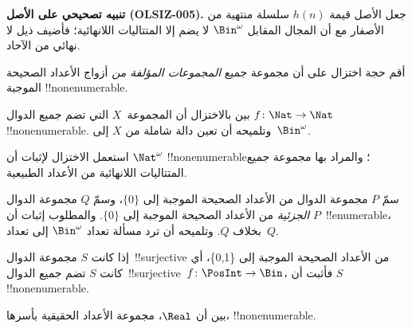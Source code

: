 \documentclass[../../../include/open-logic-section]{subfiles}
\begin{document}
\begin{editorial}
\textbf{تنبيه تصحيحي على الأصل (OLSIZ-005).}
جعل الأصل قيمة $h(n)$ سلسلة منتهية من الأصفار مع أن المجال المقابل
$\Bin^\omega$ لا يضم إلا المتتاليات اللانهائية؛ فأضيف ذيل لا نهائي من الآحاد.
\end{editorial}

\begin{prob}
أقم حجة اختزال على أن مجموعة جميع \emph{المجموعات المؤلفة من} أزواج الأعداد الصحيحة الموجبة !!{nonenumerable}.
\end{prob}

\begin{prob}\label{sfr:siz:red:prob:nat-nat}
بين بالاختزال أن المجموعة~$X$ التي تضم جميع الدوال $f\colon \Nat \to \Nat$ !!{nonenumerable}. وتلميحه أن تعين دالة شاملة من $X$ إلى~$\Bin^\omega$.
\end{prob}

\begin{prob}
استعمل الاختزال لإثبات أن $\Nat^\omega$ !!{nonenumerable}؛ والمراد بها مجموعة جميع المتتاليات اللانهائية من الأعداد الطبيعية.
\end{prob}

\begin{prob}
سمّ $P$ مجموعة الدوال من الأعداد الصحيحة الموجبة إلى $\{0\}$، وسمّ $Q$ مجموعة الدوال \emph{الجزئية} من الأعداد الصحيحة الموجبة إلى $\{0\}$. والمطلوب إثبات أن $P$~!!{enumerable}، بخلاف $Q$. وتلميحه أن ترد مسألة تعداد $\Bin^\omega$ إلى تعداد~$Q$.
\end{prob}

\begin{prob}
إذا كانت $S$ مجموعة الدوال~!!{surjective} من الأعداد الصحيحة الموجبة إلى \{0,1\}، أي كانت $S$ تضم جميع الدوال~!!{surjective}~$f\colon \PosInt \to \Bin$، فأثبت أن $S$ !!{nonenumerable}.
\end{prob}

\begin{prob}
بين أن $\Real$، مجموعة الأعداد الحقيقية بأسرها، !!{nonenumerable}.
\end{prob}
\end{document}
